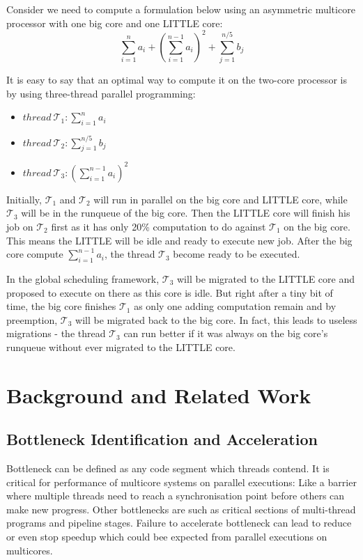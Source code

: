 \documentclass[pageno]{jpaper}
\begin{document}
Consider we need to compute a formulation below using an asymmetric multicore processor with one big core and one LITTLE core:
$$ \sum^{n}_{i=1} a_i + (\sum^{n-1}_{i=1} a_i)^2 + \sum^{n/5}_{j=1} b_j$$

It is easy to say that an optimal way to compute it on the two-core processor is by using three-thread parallel programming: 

\begin{itemize}
\item $thread\ \mathcal{T}_1: \sum^{n}_{i=1} a_i$
\item $thread\ \mathcal{T}_2: \sum^{n/5}_{j=1} b_j$
\item $thread\ \mathcal{T}_3: (\sum^{n-1}_{i=1} a_i)^2$
\end{itemize}

Initially, $\mathcal{T}_1$ and $\mathcal{T}_2$ will run in parallel on the big core and LITTLE core, while $\mathcal{T}_3$ will be in the runqueue of the big core. Then the LITTLE core will finish his job on $\mathcal{T}_2$ first as it has only 20\% computation to do against $\mathcal{T}_1$ on the big core. This means the LITTLE will be idle and ready to execute new job. After the big core compute $\sum^{n-1}_{i=1} a_i$, the thread $\mathcal{T}_3$ become ready to be executed.

In the global scheduling framework, $\mathcal{T}_3$ will be migrated to the LITTLE core and proposed to execute on there as this core is idle. But right after a tiny bit of time, the big core finishes $\mathcal{T}_1$ as only one adding computation remain and by preemption, $\mathcal{T}_3$ will be migrated back to the big core. In fact, this leads to useless migrations - the thread $\mathcal{T}_3$ can run better if it was always on the big core's runqueue without ever migrated to the LITTLE core.

\section{Background and Related Work}
\label{rw}

\subsection{Bottleneck Identification and Acceleration}
Bottleneck can be defined as any code segment which threads contend. It is critical for performance of multicore systems on parallel executions: Like a barrier where multiple threads need to reach a synchronisation point before others can make new progress. Other bottlenecks are such as critical sections of multi-thread programs and pipeline stages. Failure to accelerate bottleneck can lead to reduce or even stop speedup which could bee expected from parallel executions on multicores. 
\end{document}
